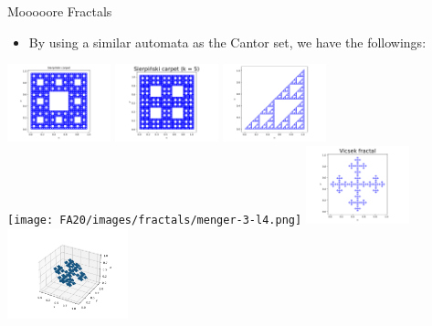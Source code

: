 \documentclass[leqno,presentation,usenames,dvipsnames]{beamer}
\begin{document}
\begin{frame}{Mooooore Fractals}
    \begin{itemize}
        \item By using a similar automata as the Cantor set, we have the followings:
    \end{itemize}
    
    \begin{center}
    \includegraphics[width=3cm]{FA20/images/fractals/sierpinski-3-l5.pdf}
    \includegraphics[width=3cm]{FA20/images/fractals/sierpinski-5-l3.pdf}
    \includegraphics[width=3cm]{FA20/images/fractals/pascal2.pdf} \\
    \texttt{[image: FA20/images/fractals/menger-3-l4.png]}
    \includegraphics[width=3cm]{FA20/images/fractals/vicsek-l5.pdf}
    \includegraphics[width=3.5cm]{FA20/images/fractals/vicsek-3d-l4.png}
\end{center}
\end{frame}
\end{document}
